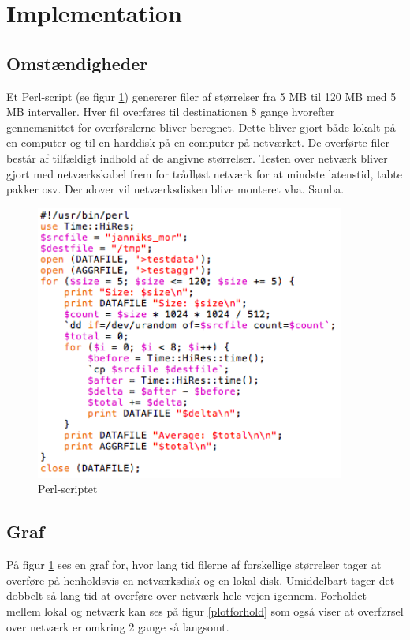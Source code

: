 \documentclass{article}
\begin{document}
\section{Implementation}

\subsection{Omstændigheder}

Et Perl-script (se figur \ref{ploto}) genererer filer af størrelser fra 5 MB til 120 MB med 5 MB intervaller. Hver fil overføres til destinationen 8 gange hvorefter gennemsnittet for overførslerne bliver beregnet. Dette bliver gjort både lokalt på en computer og til en harddisk på en computer på netværket. De overførte filer består af tilfældigt indhold af de angivne størrelser. Testen over netværk bliver gjort med netværkskabel frem for trådløst netværk for at mindste latenstid, tabte pakker osv. Derudover vil netværksdisken blive monteret vha. Samba.

\begin{figure}
	\includegraphics[width=4in]{kode.png}
	\caption{Perl-scriptet}
	\label{ploto}
\end{figure}

\subsection{Graf}
På figur \ref{ploto} ses en graf for, hvor lang tid filerne af forskellige størrelser tager at overføre på henholdsvis en netværksdisk og en lokal disk. Umiddelbart tager det dobbelt så lang tid at overføre over netværk hele vejen igennem. Forholdet mellem lokal og netværk kan ses på figur \ref{plotforhold} som også viser at overførsel over netværk er omkring 2 gange så langsomt.
\end{document}
